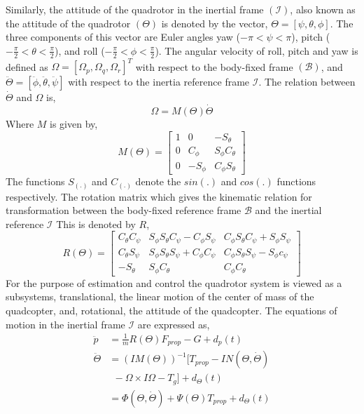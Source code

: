 \documentclass{article}
\begin{document}
Similarly, the attitude of the quadrotor in the inertial frame $(\mathcal{I})$, also known as the attitude of the quadrotor $(\Theta)$ is denoted by the vector, $\Theta=[\psi,\theta,\phi]$. The three components of this vector are Euler angles yaw ($-\pi<\psi<\pi$), pitch ($-\frac{\pi}{2}<\theta<\frac{\pi}{2}$), and roll ($-\frac{\pi}{2}<\phi<\frac{\pi}{2}$). The angular velocity of roll, pitch and yaw is defined as $\Omega=[\Omega_p,\Omega_q,\Omega_r]^T$ with respect to the body-fixed frame $(\mathcal{B})$, and $\ddot{\Theta}=[\ddot{\phi},\ddot{\theta},\ddot{\psi}]$ with respect to the inertia reference frame $\mathcal{I}$. The relation between $\dot{\Theta}$ and $\Omega$ is, 
\begin{equation}
\Omega=M(\Theta)\dot{\Theta}
\end{equation}
Where $M$ is given by, 
\begin{equation*}
M(\Theta)=
\left[\begin{array}{ccc}
1 & 0 & -S_{\theta} \\
0 & C_{\phi} & S_{\phi}C_{\theta}  \\
0 & -S_{\phi} & C_{\phi}S_{\theta}
\end{array}\right]
\end{equation*}
The functions $S_{(.)}$ and $C_{(.)}$ denote the $sin(.)$ and $cos(.)$ functions respectively. The rotation matrix which gives the kinematic relation for transformation between the body-fixed reference frame $\mathcal{B}$ and the inertial reference $\mathcal{I}$ This is denoted by $R$,
\begin{equation}
R(\Theta)=
\left[\begin{array}{ccc}
C_{\theta}C_{\psi} & S_{\phi}S_{\theta}C_{\psi}-C_{\phi}S_{\psi} & C_{\phi}S_{\theta}C_{\psi}+S_{\phi}S_{\psi} \\
C_{\theta}S_{\psi} & S_{\phi}S_{\theta}S_{\psi}+C_{\phi}C_{\psi} & C_{\phi}S_{\theta}S_{\psi}-S_{\phi}c_{\psi}  \\
-S_{\theta}  & S_{\phi}C_{\theta}  & C_{\phi}C_{\theta}
\end{array}\right]
\end{equation} 
For the purpose of estimation and control the quadrotor system is viewed as a subsystems, translational, the linear motion of the center of mass of the quadcopter, and, rotational, the attitude of the quadcopter. The equations of motion in the inertial frame $\mathcal{I}$ are expressed as,
\begin{subequations} \label{eq:dynamic_basic}
\begin{align} 
\ddot{p} &=\frac{1}{m}R(\Theta)F_{prop}-G+d_{p}(t) \label{eq:dynamic_basic_translation} \\
\ddot{\Theta} &=(IM(\Theta))^{-1}[T_{prop}-IN(\Theta,\dot{\Theta}) \nonumber \\
& \ \ -\Omega\times I\Omega-T_g]+d_{\Theta}(t)\nonumber\\
&=\Phi(\Theta,\dot{\Theta})+\Psi(\Theta) T_{prop}+d_{\Theta}(t)
 \label{eq:dynamic_basic_rotation}
\end{align}
\end{subequations}
\end{document}
